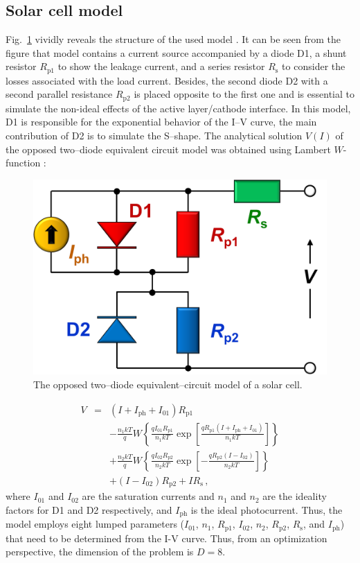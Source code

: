 \documentclass[a4paper,fleqn]{cas-dc}
\begin{document}
\subsection{Solar cell model}\label{SCModel}
Fig.~\ref{fig_chem}
vividly reveals the structure of the used model \cite{Castro2010}.
It can be seen from the figure that model contains a current source accompanied by a diode D1, a shunt
resistor $R_\mathrm{p1}$ to show the leakage current, and a series resistor $R_\mathrm{s}$ to consider the
losses associated with the load current.
Besides, the second diode D2 with a second parallel resistance $R_\mathrm{p2}$ is placed opposite to the first one and is essential to
simulate the non-ideal effects of the active layer/cathode interface.
In this model, D1 is responsible for the exponential behavior of the I--V curve,
the main contribution of D2 is to simulate the S--shape.
The analytical solution $V(I)$ of the opposed two--diode equivalent circuit model was
 obtained \cite{CastroSolution} using Lambert $W$-function \cite{LambertNew}:


\begin{figure}[]
	\centering
		\includegraphics[width=0.9\columnwidth]{Chem}
	  \caption{The opposed two--diode equivalent--circuit model of a solar cell.}\label{fig_chem}
\end{figure}


\begin{eqnarray}
\label{eqIV_W}
V&=& (I+I_\mathrm{ph}+I_{01})R_\mathrm{p1} \nonumber \\
  &&-\frac{n_1kT}{q}W\left\{\frac{qI_{01}R_\mathrm{p1}}{n_1kT}\exp\left[\frac{qR_\mathrm{p1}(I+I_\mathrm{ph}+I_{01})}{n_1kT}\right]\right\} \nonumber \\
  &&+\frac{n_2kT}{q}W\left\{\frac{qI_{02}R_\mathrm{p2}}{n_2kT}\exp\left[-\frac{qR_\mathrm{p2}(I-I_{02})}{n_2kT}\right]\right\} \nonumber \\
  &&+(I-I_{02})R_\mathrm{p2}+IR_\mathrm{s}\,,
\end{eqnarray}
where
$I_{01}$ and $I_{02}$ are the saturation currents and
$n_1$ and $n_2$ are
the ideality factors for D1 and D2 respectively,
and $I_\mathrm{ph}$ is the ideal photocurrent.
Thus, the model employs eight lumped parameters
($I_{01}$, $n_1$, $R_\mathrm{p1}$, $I_{02}$, $n_2$, $R_\mathrm{p2}$,
$R_\mathrm{s}$, and $I_\mathrm{ph}$)
that need to be determined from the I-V curve.
Thus, from an optimization perspective, the dimension of the problem is $D=8$.
\end{document}
